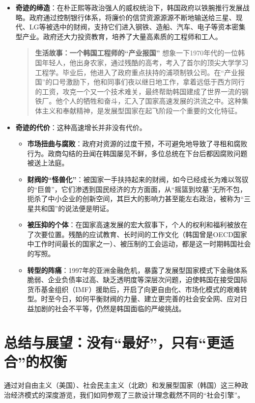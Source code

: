 \begin{itemize}
\item \textbf{奇迹的缔造}：在朴正熙等政治强人的威权统治下，韩国政府以铁腕推行发展战略。政府通过控制银行体系，将廉价的信贷资源源源不断地输送给三星、现代、LG等被选中的财阀，支持它们进入钢铁、造船、汽车、电子等资本密集型产业。政府还大力投资教育，培养了大量高素质的工程师和工人。
\begin{quote}
\textbf{生活故事：一个韩国工程师的“产业报国”}
想象一下1970年代的一位韩国年轻人，他出身农家，通过残酷的高考，考入了首尔的顶尖大学学习工程学。毕业后，他进入了政府重点扶持的浦项制铁公司。在“产业报国”的口号激励下，他和同事们夜以继日地工作，拿着远低于西方同行的工资，攻克一个又一个技术难关，最终帮助韩国建成了世界一流的钢铁厂。他个人的牺牲和奋斗，汇入了国家高速发展的洪流之中。这种集体主义和奉献精神，是发展型国家在起飞阶段一个重要的文化特征。
\end{quote}
\item \textbf{奇迹的代价}：这种高速增长并非没有代价。
\begin{itemize}
\item \textbf{市场扭曲与腐败}：政府对资源的过度干预，不可避免地导致了寻租和腐败行为。政商勾结的丑闻在韩国屡见不鲜，多位总统在下台后都因腐败问题被送上法庭。
\item \textbf{财阀的“怪兽化”}：被国家一手扶持起来的财阀，如今已经成长为难以驾驭的“巨兽”，它们渗透到国民经济的方方面面，从“摇篮到坟墓”无所不包，扼杀了中小企业的创新空间，其巨大的影响力甚至能左右政治，被称为“三星共和国”的说法便是明证。
\item \textbf{被压抑的个体}：在国家高速发展的宏大叙事下，个人的权利和福利被放在了次要位置。残酷的应试教育、长时间的工作文化（韩国曾是OECD国家中工作时间最长的国家之一）、被压制的工会运动，都是这一时期韩国社会的写照。
\item \textbf{转型的阵痛}：1997年的亚洲金融危机，暴露了发展型国家模式下金融体系脆弱、企业负债率过高、缺乏透明度等深层次问题，迫使韩国在接受国际货币基金组织（IMF）援助后，开启了向更自由化、市场化模式的艰难转型。时至今日，如何平衡财阀的力量、建立更完善的社会安全网、应对日益加剧的社会不平等，仍然是韩国面临的严峻挑战。
\end{itemize}
\end{itemize}

\section{总结与展望：没有“最好”，只有“更适合”的权衡}

通过对自由主义（美国）、社会民主主义（北欧）和发展型国家（韩国）这三种政治经济模式的深度游览，我们如同参观了三款设计理念截然不同的“社会引擎”。


